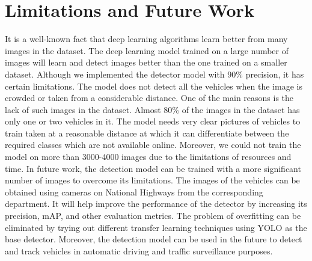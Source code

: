 \section{Limitations and Future Work}
It is a well-known fact that deep learning algorithms learn better from many images in the dataset. The deep learning model trained on a large number of images will learn and detect images better than the one trained on a smaller dataset. Although we implemented the detector model with 90\% precision, it has certain limitations. The model does not detect all the vehicles when the image is crowded or taken from a considerable distance. One of the main reasons is the lack of such images in the dataset. Almost 80\% of the images in the dataset has only one or two vehicles in it. The model needs very clear pictures of vehicles to train taken at a reasonable distance at which it can differentiate between the required classes which are not available online. Moreover, we could not train the model on more than 3000-4000 images due to the limitations of resources and time. 
\noindent
In future work, the detection model can be trained with a more significant number of images to overcome its limitations. The images of the vehicles can be obtained using cameras on National Highways from the corresponding department. It will help improve the performance of the detector by increasing its precision, mAP, and other evaluation metrics. The problem of overfitting can be eliminated by trying out different transfer learning techniques using YOLO as the base detector. Moreover, the detection model can be used in the future to detect and track vehicles in automatic driving and traffic surveillance purposes.
